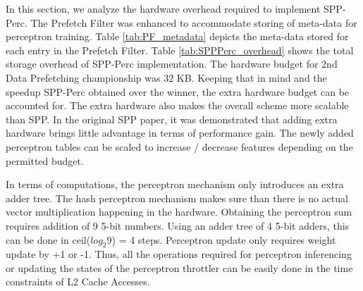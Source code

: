 
In this section, we analyze the hardware overhead required to
implement SPP-Perc.  The Prefetch Filter was enhanced to accommodate
storing of meta-data for perceptron training.  Table
\ref{tab:PF_metadata} depicts the meta-data stored for each entry in
the Prefetch Filter.  Table \ref{tab:SPPPerc_overhead} shows the total
storage overhead of SPP-Perc implementation.  The hardware budget for
2nd Data Prefetching championship was 32 KB.  Keeping that in mind and
the speedup SPP-Perc obtained over the winner, the extra hardware
budget can be accounted for.  The extra hardware also makes the
overall scheme more scalable than SPP.  In the original SPP paper, it
was demonstrated that adding extra hardware brings little advantage in
terms of performance gain.  The newly added perceptron tables can be
scaled to increase / decrease features depending on the permitted
budget.

In terms of computations, the perceptron mechanism only introduces an
extra adder tree.  The hash perceptron mechanism makes sure than there
is no actual vector multiplication happening in the hardware.
Obtaining the perceptron sum requires addition of 9 5-bit numbers.
Using an adder tree of 4 5-bit adders, this can be done in
ceil($log_{2}9$) = 4 steps.  Perceptron update only requires weight
update by +1 or -1.  Thus, all the operations required for perceptron
inferencing or updating the states of the perceptron throttler can be
easily done in the time constraints of L2 Cache Accesses.

